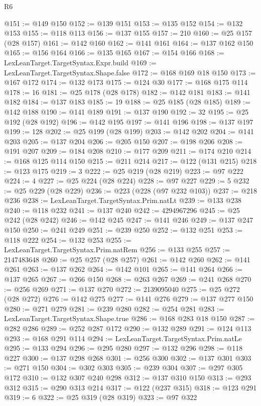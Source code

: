 \begin{lexlean}{R6}
\begin{coremodule}
@151 := @149 @150
@152 := @139 @151
@153 := @135 @152
@154 := @132 @153
@155 := @118 @113
@156 := @137 @155
@157 := 210
@160 := @25 @157 (@28 @157)
@161 := @142 @160
@162 := @141 @161
@164 := @137 @162 @150
@165 := @156 @164
@166 := @135 @165
@167 := @154 @166
@168 := LexLeanTarget.TargetSyntax.Expr.build
@169 := LexLeanTarget.TargetSyntax.Shape.false
@172 := @168 @169 @18 @150
@173 := @167 @172
@174 := @132 @173
@175 := @124 @30
@177 := @168 @175 @114
@178 := 16
@181 := @25 @178 (@28 @178)
@182 := @142 @181
@183 := @141 @182
@184 := @137 @183
@185 := 19
@188 := @25 @185 (@28 @185)
@189 := @142 @188
@190 := @141 @189
@191 := @137 @190
@192 := 32
@195 := @25 @192 (@28 @192)
@196 := @142 @195
@197 := @141 @196
@198 := @137 @197
@199 := 128
@202 := @25 @199 (@28 @199)
@203 := @142 @202
@204 := @141 @203
@205 := @137 @204
@206 := @205 @150
@207 := @198 @206
@208 := @191 @207
@209 := @184 @208
@210 := @177 @209
@211 := @174 @210
@214 := @168 @125 @114 @150
@215 := @211 @214
@217 := @122 (@131 @215)
@218 := @123 @175
@219 := 3
@222 := @25 @219 (@28 @219)
@223 := @97 @222
@224 := 4
@227 := @25 @224 (@28 @224)
@228 := @97 @227
@229 := 5
@232 := @25 @229 (@28 @229)
@236 := @223 (@228 (@97 @232 @103))
@237 := @218 @236
@238 := LexLeanTarget.TargetSyntax.Prim.natLt
@239 := @133 @238
@240 := @118 @232
@241 := @137 @240
@242 := 4294967296
@245 := @25 @242 (@28 @242)
@246 := @142 @245
@247 := @141 @246
@249 := @137 @247 @150
@250 := @241 @249
@251 := @239 @250
@252 := @132 @251
@253 := @118 @222
@254 := @132 @253
@255 := LexLeanTarget.TargetSyntax.Prim.natRem
@256 := @133 @255
@257 := 2147483648
@260 := @25 @257 (@28 @257)
@261 := @142 @260
@262 := @141 @261
@263 := @137 @262
@264 := @142 @101
@265 := @141 @264
@266 := @137 @265
@267 := @266 @150
@268 := @263 @267
@269 := @241 @268
@270 := @256 @269
@271 := @137 @270
@272 := 2139095040
@275 := @25 @272 (@28 @272)
@276 := @142 @275
@277 := @141 @276
@279 := @137 @277 @150
@280 := @271 @279
@281 := @239 @280
@282 := @254 @281
@283 := LexLeanTarget.TargetSyntax.Shape.true
@286 := @168 @283 @18 @150
@287 := @282 @286
@289 := @252 @287 @172
@290 := @132 @289
@291 := @124 @113
@293 := @168 @291 @114
@294 := LexLeanTarget.TargetSyntax.Prim.natLe
@295 := @133 @294
@296 := @295 @280
@297 := @132 @296
@298 := @118 @227
@300 := @137 @298 @268
@301 := @256 @300
@302 := @137 @301
@303 := @271 @150
@304 := @302 @303
@305 := @239 @304
@307 := @297 @305 @172
@310 := @132 @307 @240 @298
@312 := @137 @310 @150
@313 := @293 @312
@315 := @290 @313 @214
@317 := @122 (@237 @315)
@318 := @123 @291
@319 := 6
@322 := @25 @319 (@28 @319)
@323 := @97 @322

\end{coremodule}
\end{lexlean}
